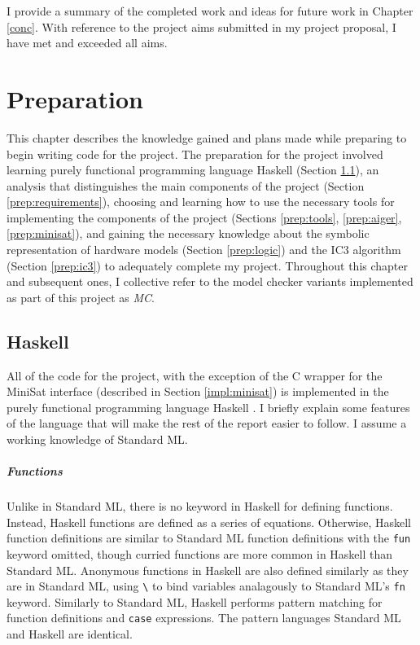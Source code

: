 \documentclass[12pt,a4paper,twoside,openright]{report}
\begin{document}
I provide a summary of the completed work and ideas for
future work in Chapter \ref{conc}. With reference to the project aims submitted in my
project proposal, I have met and exceeded all aims.

\chapter{Preparation}
\label{prep}

This chapter describes the knowledge gained and plans made while preparing
to begin writing code for the project.
The preparation for the project involved learning purely functional
programming language Haskell (Section \ref{prep:haskell}),
an analysis that distinguishes the main components of the project
(Section \ref{prep:requirements}), choosing and learning how to use
the necessary tools for implementing the components of the project
(Sections \ref{prep:tools}, \ref{prep:aiger}, \ref{prep:minisat}),
and gaining the necessary knowledge about the symbolic representation
of hardware models
(Section \ref{prep:logic}) and the IC3 algorithm (Section \ref{prep:ic3}) to
adequately complete my project.
Throughout this chapter and subsequent ones, I collective refer to the model checker
variants implemented as part of this project as \emph{MC}.

\section{Haskell}
\label{prep:haskell}

All of the code for the project, with the exception of the C wrapper for the
MiniSat interface (described in Section \ref{impl:minisat})
is implemented in the purely functional
programming language Haskell \cite{haskell}.
I briefly explain some features of the
language that will make the rest of the report easier to follow.
I assume a working knowledge of Standard ML.

\paragraph{Functions}{
Unlike in Standard ML, there is no keyword in Haskell for defining functions. Instead,
Haskell functions are defined as a series of equations. Otherwise,
Haskell function definitions are similar to Standard ML function definitions with the
\verb,fun, keyword omitted, though curried functions are more common in Haskell than
Standard ML. Anonymous functions in Haskell are also defined similarly
as they are in Standard ML, using \verb,\, to bind variables analagously to Standard
ML's \verb,fn, keyword. Similarly to Standard ML, Haskell performs pattern matching
for function definitions and \verb,case, expressions. The pattern languages Standard
ML and Haskell are identical.
}
\end{document}
